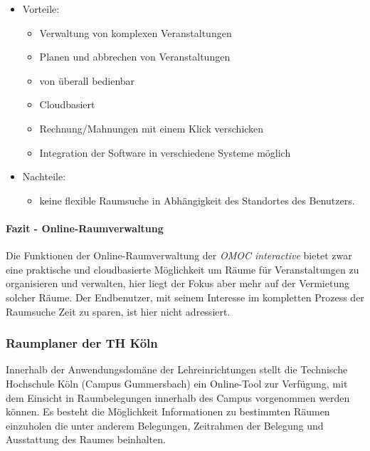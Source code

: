 \begin{itemize}
	\item Vorteile:
		\begin{itemize}
			\item Verwaltung von komplexen Veranstaltungen
			\item Planen und abbrechen von Veranstaltungen
			\item von überall bedienbar
			\item Cloudbasiert
			\item Rechnung/Mahnungen mit einem Klick verschicken
			\item Integration der Software in verschiedene Systeme möglich
		\end{itemize}
	\item Nachteile:
		\begin{itemize}
			\item keine flexible Raumsuche in Abhängigkeit des Standortes des Benutzers.
		\end{itemize}
\end{itemize}

\paragraph{Fazit - Online-Raumverwaltung}
\label{sec:Fazit_Online-Raumverwaltung}

Die Funktionen der Online-Raumverwaltung \citep{omoc} der
\textit{OMOC interactive} bietet zwar eine praktische und cloudbasierte
Möglichkeit um Räume für Veranstaltungen zu organisieren und verwalten, hier
liegt der Fokus aber mehr auf der Vermietung solcher Räume. Der Endbenutzer,
mit seinem Interesse im kompletten Prozess der Raumsuche Zeit zu sparen, ist
hier nicht adressiert.   

\subsubsection{Raumplaner der TH Köln}
\label{sec:Raumplaner_der_TH_Köln}

Innerhalb der Anwendungsdomäne der Lehreinrichtungen stellt die 
Technische Hochschule Köln (Campus Gummersbach) ein Online-Tool \citep{thkoeln}
zur Verfügung, mit dem Einsicht in Raumbelegungen innerhalb des Campus
vorgenommen werden können. Es besteht die Möglichkeit Informationen zu
bestimmten Räumen einzuholen die unter anderem Belegungen, Zeitrahmen der
Belegung und Ausstattung des Raumes beinhalten.

